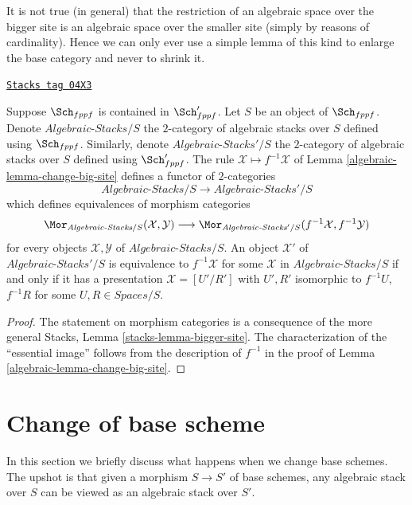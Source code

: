 It is not true (in general) that the restriction of an algebraic space
over the bigger site is an algebraic space over the smaller site (simply
by reasons of cardinality). Hence we can only ever use a simple lemma of this
kind to enlarge the base category and never to shrink it.

\begin{lemma}
\label{algebraic-lemma-fully-faithful}
\href{https://stacks.math.columbia.edu/tag/04X3}{\texttt{Stacks tag 04X3}}

Suppose $\Sch_{fppf}$ is contained in $\Sch'_{fppf}$.
Let $S$ be an object of $\Sch_{fppf}$. Denote
$\textit{Algebraic-Stacks}/S$ the $2$-category of algebraic stacks over $S$
defined using $\Sch_{fppf}$. Similarly, denote
$\textit{Algebraic-Stacks}'/S$ the $2$-category of algebraic stacks over $S$
defined using $\Sch'_{fppf}$. The rule
$\mathcal{X} \mapsto f^{-1}\mathcal{X}$ of
Lemma \ref{algebraic-lemma-change-big-site}
defines a functor of $2$-categories
$$
\textit{Algebraic-Stacks}/S \longrightarrow \textit{Algebraic-Stacks}'/S
$$
which defines equivalences of morphism categories
$$
\Mor_{\textit{Algebraic-Stacks}/S}(\mathcal{X}, \mathcal{Y})
\longrightarrow
\Mor_{\textit{Algebraic-Stacks}'/S}(f^{-1}\mathcal{X}, f^{-1}\mathcal{Y})
$$
for every objects $\mathcal{X}, \mathcal{Y}$ of
$\textit{Algebraic-Stacks}/S$. An object
$\mathcal{X}'$ of $\textit{Algebraic-Stacks}'/S$
is equivalence to $f^{-1}\mathcal{X}$ for some
$\mathcal{X}$ in $\textit{Algebraic-Stacks}/S$
if and only if it has a presentation $\mathcal{X} = [U'/R']$
with $U', R'$ isomorphic to $f^{-1}U$, $f^{-1}R$ for some
$U, R \in \textit{Spaces}/S$.
\end{lemma}

\begin{proof}

The statement on morphism categories is a consequence of the more general
Stacks, Lemma \ref{stacks-lemma-bigger-site}.
The characterization of the ``essential image'' follows from the description
of $f^{-1}$ in the proof of
Lemma \ref{algebraic-lemma-change-big-site}.
\end{proof}

\section{Change of base scheme}
\label{algebraic-section-change-base-scheme}
In this section we briefly discuss what happens when we change base schemes.
The upshot is that given a morphism $S \to S'$ of base schemes, any algebraic
stack over $S$ can be viewed as an algebraic stack over $S'$.


